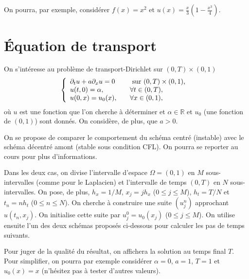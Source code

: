 \documentclass[12pt]{article}
\newcommand*{\R}{\mathbb{R}}
\begin{document}
On pourra, par exemple, consid\'erer $f(x) = x^2$ et $u(x) = \frac{x}{3}(1-\frac{x^3}{4})$.


\section{\'Equation de transport}

On s'int\'eresse au probl\`eme de transport-Dirichlet sur $(0,T) \times (0,1)$
\begin{equation}
  \label{eq:transport}
  \left\{
    \begin{array}{l l}
      \partial_t u + a \partial_x u = 0 &\text{ sur $(0,T) \times (0,1)$, }
      \\
      u(t,0) = \alpha , \quad &\forall t \in (0,T) ,
      \\
      u(0,x) = u_0(x) , \quad &\forall x \in (0,1) ,
    \end{array}
  \right.
\end{equation}
o\`u $u$ est une fonction que l'on cherche \`a d\'eterminer et
$\alpha \in \R$ et $u_0$ (une fonction de $(0,1)$) sont donn\'es. On consid\`ere, de plus, que $a > 0$.

On se propose de comparer le comportement du sch\'ema centr\'e (instable)
avec le sch\'ema d\'ecentr\'e amont (stable sous condition CFL).
On pourra se reporter au cours pour plus d'informations.


Dans les deux cas, on divise l'intervalle d'espace $\Omega = (0,1)$ en
$M$ sous-intervalles (comme pour le Laplacien) et l'intervalle de temps
$(0,T)$ en $N$ sous-intervalles.
On pose, de plus, $h_x = 1/M$, $x_j = jh_x$ ($0 \leq j \leq M$),
$h_t = T/N$ et $t_n = nh_t$ ($0 \leq n \leq N$).
On cherche \`a construire une suite $(u_j^n)$ approchant $u(t_n,x_j)$.
On initialise cette suite par $u_j^0 = u_0(x_j)$ ($0 \leq j \leq M$).
On utilise ensuite l'un des deux sch\'emas propos\'es ci-dessous pour
calculer les pas de temps suivants.


Pour juger de la qualit\'e du r\'esultat, on affichera la solution au temps final $T$.
Pour simplifier, on pourra par exemple consid\'erer $\alpha = 0$, $a=1$, $T=1$ et $u_0(x) = x$
(n'h\'esitez pas \`a tester d'autres valeurs).
\end{document}
